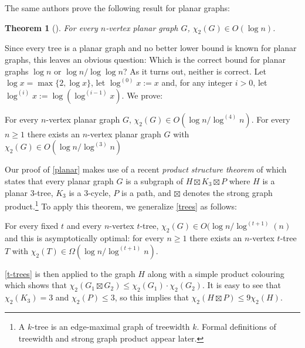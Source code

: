 \documentclass[kpfonts]{patmorin}
\newcommand{\uqs}{\chi_2}
\newtheorem{othertheorem}{Theorem}
\begin{document}
The same authors prove the following result for planar graphs:

\setcounter{othertheorem}{15}
\begin{othertheorem}[\cite{karpas.neiman.ea:on}]\label{planar-graphs}
    For every $n$-vertex planar graph $G$, $\uqs(G)\in O(\log n)$.
\end{othertheorem}

Since every tree is a planar graph and no better lower bound is known for planar graphs, this leaves an obvious question:  Which is the correct bound for planar graphs $\log n$ or $\log n/\log\log n$?  As it turns out, neither is correct.  Let $\log x =\max\{2,\log x\}$, let $\log^{(0)}x:=x$ and, for any integer $i>0$, let $\log^{(i)}x:=\log(\log^{(i-1)} x)$. We prove:


\begin{thm}\label{planar}
    For every $n$-vertex planar graph $G$, $\uqs(G)\in O(\log n/\log^{(4)} n)$.  For every $n\ge 1$ there exists an $n$-vertex planar graph $G$ with $\uqs(G)\in O(\log n/\log^{(3)} n)$
\end{thm}

Our proof of \cref{planar} makes use of a recent \emph{product structure theorem} of \citet{dujmovic.joret.ea:planar} which states that every planar graph $G$ is a subgraph of $H\boxtimes K_3\boxtimes P$ where $H$ is a planar $3$-tree, $K_3$ is a 3-cycle, $P$ is a path, and $\boxtimes$ denotes the strong graph product.\footnote{A $k$-tree is an edge-maximal graph of treewidth $k$. Formal definitions of treewidth and strong graph product appear later.}  To apply this theorem, we generalize \cref{trees} as follows:

\begin{thm}\label{t-trees}
    For every fixed $t$ and every $n$-vertex $t$-tree, $\uqs(G) \in O(\log n/\log^{(t+1)}(n)$ and this is asymptotically optimal: for every $n\ge 1$ there exists an $n$-vertex $t$-tree $T$ with $\uqs(T)\in\Omega(\log n/\log^{(t+1)} n)$.
\end{thm}

\cref{t-trees} is then applied to the graph $H$ along with a simple product colouring which shows that $\uqs(G_1\boxtimes G_2)\le \uqs(G_1)\cdot\uqs(G_2)$. It is easy to see that $\uqs(K_3)=3$ and $\uqs(P)\le 3$, so this implies that $\uqs(H\boxtimes P)\le 9\uqs(H)$.

\end{document}
